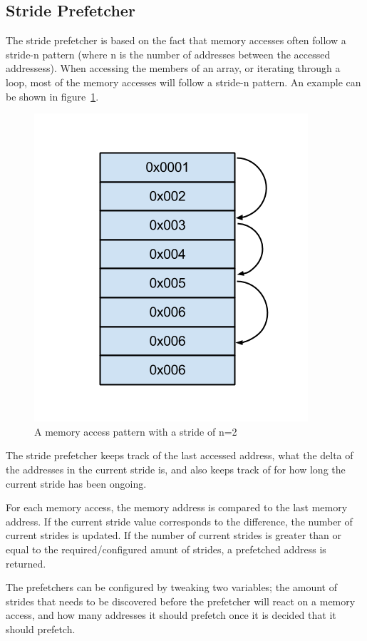 \subsection{Stride Prefetcher}
\label{sec:stridePrefetcher}
The stride prefetcher is based on the fact that memory accesses
often follow a stride-n pattern (where n is the number of addresses between
the accessed addressess). When accessing the members of an
array, or iterating through a loop, most of the memory accesses will
follow a stride-n pattern. An example can be shown in figure~\ref{fig:stride}.

\begin{figure}[H]
\label{fig:stride}
\centerline{\includegraphics[scale=0.5]{./figures/stride}}
\caption{A memory access pattern with a stride of n=2}
\end{figure}

The stride prefetcher keeps track of the last accessed address, what the delta of the addresses in the current stride is, and
also keeps track of for how long the current stride has been
ongoing. 

For each memory access, the memory address is compared to the last
memory address. If the current stride value corresponds to the
difference, the number of current strides is updated. If the number of
current strides is greater than or equal to the required/configured
amunt of strides, a prefetched address is returned.  

The prefetchers can be configured by tweaking two variables;
the amount of strides that needs to be discovered before
the prefetcher will react on a memory access, and how many addresses it should prefetch once it is decided that it should prefetch.

